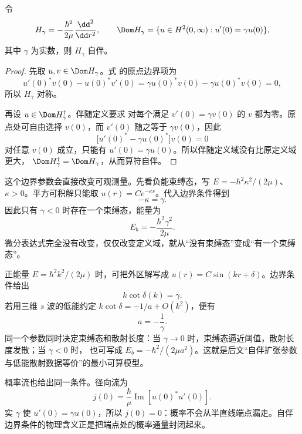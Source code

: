\begin{proposition}
令
\[
H_\gamma=-\frac{\hbar^2}{2\mu}\frac{\dd^2}{\dd r^2},
\qquad
\Dom H_\gamma
=\{u\in H^2(0,\infty):u'(0)=\gamma u(0)\},
\]
其中 \(\gamma\) 为实数，则 \(H_\gamma\) 自伴。
\end{proposition}

\begin{proof}
先取 \(u,v\in\Dom H_\gamma\)。式
 的原点边界项为
\[
u'(0)^*v(0)-u(0)^*v'(0)
=\gamma u(0)^*v(0)-\gamma u(0)^*v(0)=0,
\]
所以 \(H_\gamma\) 对称。

再设 \(u\in\Dom H_\gamma^\dagger\)。伴随定义要求
 对每个满足
\(v'(0)=\gamma v(0)\) 的 \(v\) 都为零。原点处可自由选择
\(v(0)\)，而 \(v'(0)\) 随之等于 \(\gamma v(0)\)，因此
\[
\bigl[u'(0)^*-\gamma u(0)^*\bigr]v(0)=0
\]
对任意 \(v(0)\) 成立，只能有
\(u'(0)=\gamma u(0)\)。所以伴随定义域没有比原定义域更大，
\(\Dom H_\gamma^\dagger=\Dom H_\gamma\)，从而算符自伴。
\end{proof}

这个边界参数会直接改变可观测量。先看负能束缚态，写
\(E=-\hbar^2\kappa^2/(2\mu)\)、\(\kappa>0\)。平方可积解只能取
\(u(r)=Ce^{-\kappa r}\)。代入边界条件得到
\[
-\kappa=\gamma.
\]
因此只有 \(\gamma<0\) 时存在一个束缚态，能量为
\begin{equation}
E_b=-\frac{\hbar^2\gamma^2}{2\mu}.
\label{eq:radial-robin-bound-state}
\end{equation}
微分表达式完全没有改变，仅仅改变定义域，就从“没有束缚态”变成“有一个束缚态”。

正能量 \(E=\hbar^2k^2/(2\mu)\) 时，可把外区解写成
\(u(r)=C\sin(kr+\delta)\)。边界条件给出
\begin{equation}
k\cot\delta(k)=\gamma.
\label{eq:radial-robin-phase-shift}
\end{equation}
若用三维 \(s\) 波的低能约定
\(k\cot\delta=-1/a+O(k^2)\)，便有
\begin{equation}
a=-\frac1\gamma.
\label{eq:radial-robin-scattering-length}
\end{equation}
同一个参数同时决定束缚态和散射长度：当 \(\gamma\to0\) 时，束缚态逼近阈值，散射长度发散；当 \(\gamma<0\) 时，
 也可写成
\(E_b=-\hbar^2/(2\mu a^2)\)。这就是后文“自伴扩张参数与低能散射数据等价”的最小可算模型。

概率流也给出同一条件。径向流为
\[
j(0)=\frac\hbar\mu\operatorname{Im}[u(0)^*u'(0)].
\]
实 \(\gamma\) 使 \(u'(0)=\gamma u(0)\)，所以 \(j(0)=0\)：概率不会从半直线端点漏走。自伴边界条件的物理含义正是把端点处的概率通量封闭起来。

